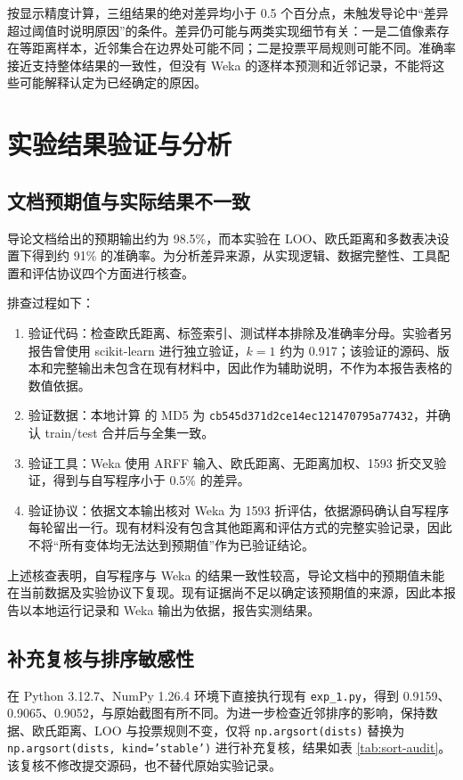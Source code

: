 \documentclass[UTF8,zihao=-4]{ctexart}
\begin{document}
按显示精度计算，三组结果的绝对差异均小于 0.5 个百分点，未触发导论中“差异超过阈值时说明原因”的条件。差异仍可能与两类实现细节有关：一是二值像素存在等距离样本，近邻集合在边界处可能不同；二是投票平局规则可能不同。准确率接近支持整体结果的一致性，但没有 Weka 的逐样本预测和近邻记录，不能将这些可能解释认定为已经确定的原因。

\section{实验结果验证与分析}

\subsection{文档预期值与实际结果不一致}

导论文档给出的预期输出约为 98.5\%，而本实验在 LOO、欧氏距离和多数表决设置下得到约 91\% 的准确率。为分析差异来源，从实现逻辑、数据完整性、工具配置和评估协议四个方面进行核查。

排查过程如下：

\begin{enumerate}[label=\arabic*.]
  \item 验证代码：检查欧氏距离、标签索引、测试样本排除及准确率分母。实验者另报告曾使用 scikit-learn 进行独立验证，$k=1$ 约为 0.917；该验证的源码、版本和完整输出未包含在现有材料中，因此作为辅助说明，不作为本报告表格的数值依据。
  \item 验证数据：本地计算  的 MD5 为 \texttt{cb545d371d2ce14ec121\allowbreak470795a77432}，并确认 train/test 合并后与全集一致。
  \item 验证工具：Weka 使用 ARFF 输入、欧氏距离、无距离加权、1593 折交叉验证，得到与自写程序小于 0.5\% 的差异。
  \item 验证协议：依据文本输出核对 Weka 为 1593 折评估，依据源码确认自写程序每轮留出一行。现有材料没有包含其他距离和评估方式的完整实验记录，因此不将“所有变体均无法达到预期值”作为已验证结论。
\end{enumerate}

上述核查表明，自写程序与 Weka 的结果一致性较高，导论文档中的预期值未能在当前数据及实验协议下复现。现有证据尚不足以确定该预期值的来源，因此本报告以本地运行记录和 Weka 输出为依据，报告实测结果。

\subsection{补充复核与排序敏感性}

在 Python 3.12.7、NumPy 1.26.4 环境下直接执行现有 \texttt{exp\_1.py}，得到 0.9159、0.9065、0.9052，与原始截图有所不同。为进一步检查近邻排序的影响，保持数据、欧氏距离、LOO 与投票规则不变，仅将 \texttt{np.argsort(dists)} 替换为 \texttt{np.argsort(dists, kind='stable')} 进行补充复核，结果如表 \ref{tab:sort-audit}。该复核不修改提交源码，也不替代原始实验记录。
\end{document}
